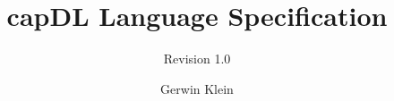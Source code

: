 \documentclass[english,a4paper,11pt]{article}
\begin{document}
\title{capDL Language Specification}
\subtitle{Revision 1.0}
\author{Gerwin Klein}
\date{}

\maketitle


\end{document}
